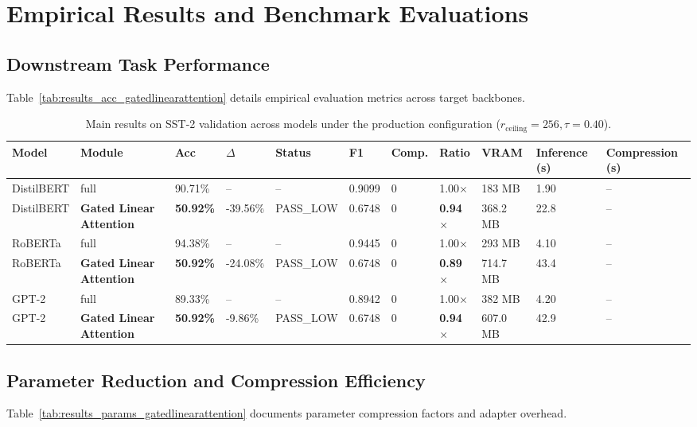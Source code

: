 \section{Empirical Results and Benchmark Evaluations}

\subsection{Downstream Task Performance}
Table~\ref{tab:results_acc_gatedlinearattention} details empirical evaluation metrics across target backbones.

\begin{table}[t]
\centering
\small
\begin{tabular}{lllllllllll}
\toprule
\textbf{Model} & \textbf{Module} & \textbf{Acc} & \textbf{$\Delta$} & \textbf{Status} & \textbf{F1} & \textbf{Comp.} & \textbf{Ratio} & \textbf{VRAM} & \textbf{Inference (s)} & \textbf{Compression (s)} \\
\midrule
DistilBERT & full & 90.71\% & -- & -- & 0.9099 & 0 & 1.00$\times$ & 183 MB & 1.90 & -- \\
DistilBERT & \textbf{Gated Linear Attention} & \textbf{50.92\%} & -39.56\% & PASS_LOW & 0.6748 & 0 & \textbf{0.94$\times$} & 368.2 MB & 22.8 & -- \\
RoBERTa & full & 94.38\% & -- & -- & 0.9445 & 0 & 1.00$\times$ & 293 MB & 4.10 & -- \\
RoBERTa & \textbf{Gated Linear Attention} & \textbf{50.92\%} & -24.08\% & PASS_LOW & 0.6748 & 0 & \textbf{0.89$\times$} & 714.7 MB & 43.4 & -- \\
GPT-2 & full & 89.33\% & -- & -- & 0.8942 & 0 & 1.00$\times$ & 382 MB & 4.20 & -- \\
GPT-2 & \textbf{Gated Linear Attention} & \textbf{50.92\%} & -9.86\% & PASS_LOW & 0.6748 & 0 & \textbf{0.94$\times$} & 607.0 MB & 42.9 & -- \\
\bottomrule
\end{tabular}
\caption{Main results on SST-2 validation across models under the production configuration ($r_{\mathrm{ceiling}}=256, \tau=0.40$).}
\label{tab:main_sst2}
\end{table}

\subsection{Parameter Reduction and Compression Efficiency}
Table~\ref{tab:results_params_gatedlinearattention} documents parameter compression factors and adapter overhead.

